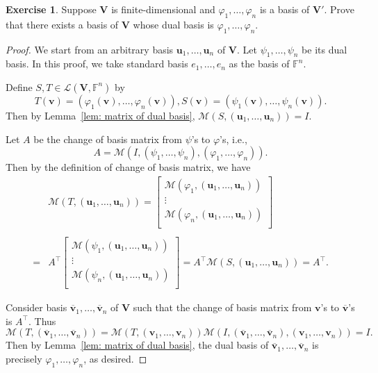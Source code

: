 \documentclass{tufte-handout}
\def \v {\vspace{0.2cm}}
\theoremstyle{plain} %
\theoremstyle{definition}
\newtheorem{exer}[thm]{Exercise}
\theoremstyle{remark}
\newcommand{\bra}[1]{\mathopen{}\left(#1\right)}
\renewcommand{\phi}{\varphi}
\newcommand{\F}{\mathbb{F}}
\newcommand{\mL}{\mathcal{L}}
\newcommand{\mM}{\mathcal{M}}
\newcommand{\V}{\bm{V}}
\renewcommand{\u}{\bm{u}}
\renewcommand{\v}{\bm{v}}
\begin{document}
\begin{exer}
	Suppose $\V$ is finite-dimensional and $\phi_1,\dots,\phi_n$ is a basis of $\V'$. Prove that there exists a basis of $\V$ whose dual basis is $\phi_1,\dots,\phi_n$.
\end{exer}
\begin{proof}
	We start from an arbitrary basis $\u_1,\dots,\u_n$ of $\V$. Let $\psi_1,\dots,\psi_n$ be its dual basis. In this proof, we take standard basis $e_1,\dots,e_n$ as the basis of $\F^n$.
	
	Define $S,T\in\mL\bra{\V,\F^n}$ by
	\[T(\v)=\bra{\phi_1(\v),\dots,\phi_n(\v)},S(\v)=\bra{\psi_1(\v),\dots,\psi_n(\v)}.\]
	Then by Lemma~\ref{lem: matrix of dual basis}, $\mM\bra{S,\bra{\u_1,\dots,\u_n}}=I$.
	
	Let $A$ be the change of basis matrix from $\psi$'s to $\phi$'s, i.e.,
	\[A=\mM\bra{I,\bra{\psi_1,\dots,\psi_n},\bra{\phi_1,\dots,\phi_n}}.\]
	Then by the definition of change of basis matrix, we have
	\begin{align*}
		&\mM\bra{T,\bra{\u_1,\dots,\u_n}}=\begin{bmatrix}
			\mM\bra{\phi_1,\bra{\u_1,\dots,\u_n}}\\
			\vdots\\
			\mM\bra{\phi_n,\bra{\u_1,\dots,\u_n}}\\
		\end{bmatrix}\\\\
		=&A^\intercal\begin{bmatrix}
			\mM\bra{\psi_1,\bra{\u_1,\dots,\u_n}}\\
			\vdots\\
			\mM\bra{\psi_n,\bra{\u_1,\dots,\u_n}}\\
		\end{bmatrix}=A^\intercal\mM\bra{S,\bra{\u_1,\dots,\u_n}}=A^\intercal.
	\end{align*}\vspace{0em}

	Consider basis $\overline{\v}_1,\dots,\overline{\v}_n$ of $\V$ such that the change of basis matrix from $\v$'s to $\overline{\v}$'s is $A^\intercal$. Thus
	\[\mM\bra{T,\bra{\overline{\v}_1,\dots,\overline{\v}_n}}=\mM\bra{T,\bra{\v_1,\dots,\v_n}}\mM\bra{I,\bra{\overline{\v}_1,\dots,\overline{\v}_n},\bra{\v_1,\dots,\v_n}}=I.\]
	Then by Lemma~\ref{lem: matrix of dual basis}, the dual basis of $\overline{\v}_1,\dots,\overline{\v}_n$ is precisely $\phi_1,\dots,\phi_n$, as desired.
\end{proof}
\end{document}
